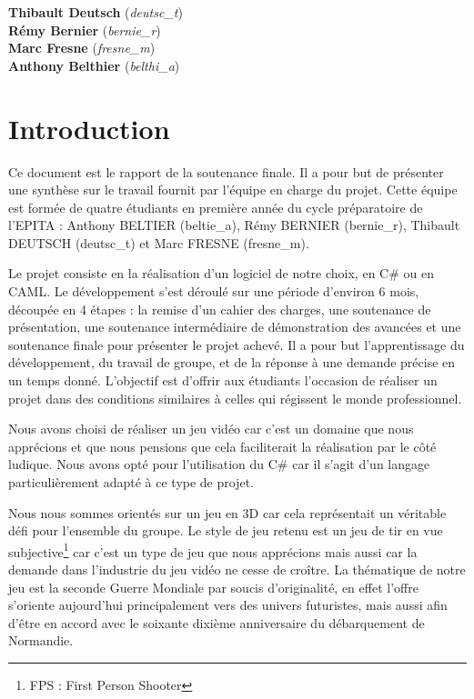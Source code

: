 \documentclass[11pt]{report}
\begin{document}
\begin{titlepage}
\Large
\textbf{Thibault Deutsch} (\emph{deutsc\_t}) \\
\textbf{Rémy Bernier} (\emph{bernie\_r}) \\
\textbf{Marc Fresne} (\emph{fresne\_m}) \\
\textbf{Anthony Belthier} (\emph{belthi\_a})\\[2cm]

\vfill %

\end{titlepage}

\newpage
{}

\chapter*{Introduction}

Ce document est le rapport de la soutenance finale. Il a pour but de présenter une synthèse sur le travail fournit par l'équipe en charge du projet. Cette équipe est formée de quatre étudiants en première année du cycle préparatoire de l'EPITA : Anthony BELTIER (beltie\_a), Rémy BERNIER (bernie\_r), Thibault DEUTSCH (deutsc\_t) et Marc FRESNE (fresne\_m).

Le projet consiste en la réalisation d'un logiciel de notre choix, en C\# ou en CAML. Le développement s'est déroulé sur une période d'environ 6 mois, découpée en 4 étapes : la remise d'un cahier des charges, une soutenance de présentation, une soutenance intermédiaire de démonstration des avancées et une soutenance finale pour présenter le projet achevé. Il a pour but l'apprentissage du développement, du travail de groupe, et de la réponse à une demande précise en un temps donné. L'objectif est d'offrir aux étudiants l'occasion de réaliser un projet dans des conditions similaires à celles qui régissent le monde professionnel.

Nous avons choisi de réaliser un jeu vidéo car c'est un domaine que nous apprécions et que nous pensions que cela faciliterait la réalisation par le côté ludique. Nous avons opté pour l’utilisation du C\# car il s’agit d’un langage particulièrement adapté à ce type de projet. 

Nous nous sommes orientés sur un jeu en 3D car cela représentait un véritable défi pour l'ensemble du groupe. Le style de jeu retenu est un jeu de tir en vue subjective\footnote{FPS : First Person Shooter} car c'est un type de jeu que nous apprécions mais aussi car la demande dans l'industrie du jeu vidéo ne cesse de croître. La thématique de notre jeu est la seconde Guerre Mondiale par soucis d'originalité, en effet l'offre s'oriente aujourd'hui principalement vers des univers futuristes, mais aussi afin d'être en accord avec le soixante dixième anniversaire du débarquement de Normandie.
\end{document}
